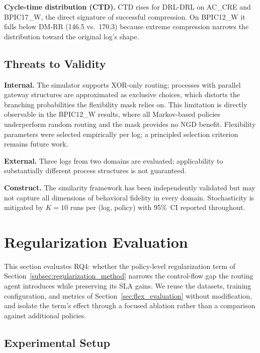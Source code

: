 \documentclass[journal,onecolumn]{IEEEtran}
\begin{document}
\noindent\textbf{Cycle-time distribution (CTD).}
CTD rises for DRL-DRL on AC\_CRE and BPIC17\_W, the direct
signature of successful compression. On BPIC12\_W it falls below
DM-RR (146.5 vs.\ 170.3) because extreme compression narrows the
distribution toward the original log's shape.

\subsection{Threats to Validity}
\label{subsec:threats}

\noindent\textbf{Internal.}
The simulator supports XOR-only routing; processes with parallel
gateway structures are approximated as exclusive choices, which
distorts the branching probabilities the flexibility mask relies
on. This limitation is directly observable in the BPIC12\_W
results, where all Markov-based policies underperform random routing
and the mask provides no NGD benefit. Flexibility parameters were
selected empirically per log; a principled selection criterion
remains future work.

\noindent\textbf{External.}
Three logs from two domains are evaluated; applicability to
substantially different process structures is not guaranteed.

\noindent\textbf{Construct.}
The
\citeauthor{framework_for_measuring_the_quality_of_business_process_simulation_models}
similarity framework has been independently validated but may not
capture all dimensions of behavioral fidelity in every domain.
Stochasticity is mitigated by $K=10$ runs per (log, policy) with
95\%~CI reported throughout.

\section{Regularization Evaluation}
\label{sec:reg_evaluation}

This section evaluates RQ4: whether the policy-level regularization
term of Section~\ref{subsec:regularization_method} narrows the control-flow gap
the routing agent introduces while preserving its SLA gains. We reuse
the datasets, training configuration, and metrics of
Section~\ref{sec:flex_evaluation} without modification, and isolate the
term's effect through a focused ablation rather than a comparison
against additional policies.

\subsection{Experimental Setup}
\label{subsec:reg_setup}
\end{document}
